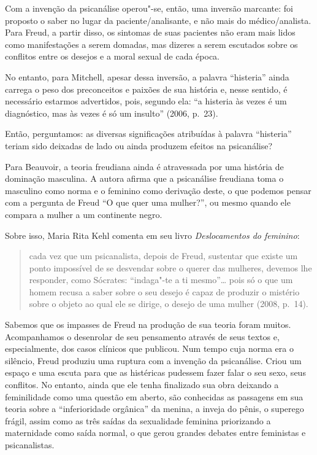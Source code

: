 Com a invenção da psicanálise operou"-se, então, uma inversão marcante:
foi proposto o saber no lugar da paciente/analisante, e não mais do
médico/analista. Para Freud, a partir disso, os sintomas de suas
pacientes não eram mais lidos como manifestações a serem domadas, mas
dizeres a serem escutados sobre os conflitos entre os desejos e a moral
sexual de cada época.

No entanto, para Mitchell, apesar dessa inversão, a palavra ``histeria''
ainda carrega o peso dos preconceitos e paixões de sua história e, nesse
sentido, é necessário estarmos advertidos, pois, segundo ela: ``a
histeria às vezes é um diagnóstico, mas às vezes é só um insulto''
(2006, p.~23).

Então, perguntamos: as diversas significações atribuídas à palavra
``histeria'' teriam sido deixadas de lado ou ainda produzem efeitos na
psicanálise?

\asterisc

Para Beauvoir, a teoria freudiana ainda é atravessada por uma história
de dominação masculina. A autora afirma que a psicanálise freudiana toma
o masculino como norma e o feminino como derivação deste, o que podemos
pensar com a pergunta de Freud ``O que quer uma mulher?'', ou mesmo
quando ele compara a mulher a um continente negro.

Sobre isso, Maria Rita Kehl comenta em seu livro \emph{Deslocamentos do
feminino}:

\begin{quote}
cada vez que um psicanalista, depois de Freud, sustentar que existe um
ponto impossível de se desvendar sobre o querer das mulheres, devemos
lhe responder, como Sócrates: ``indaga"-te a ti mesmo''\ldots{} pois só o que
um homem recusa a saber sobre o seu desejo é capaz de produzir o
mistério sobre o objeto ao qual ele se dirige, o desejo de uma mulher
(2008, p.~14).
\end{quote}

Sabemos que os impasses de Freud na produção de sua teoria foram muitos.
Acompanhamos o desenrolar de seu pensamento através de seus textos e,
especialmente, dos casos clínicos que publicou. Num tempo cuja norma era
o silêncio, Freud produziu uma ruptura com a invenção da psicanálise.
Criou um espaço e uma escuta para que as histéricas pudessem fazer falar
o seu sexo, seus conflitos. No entanto, ainda que ele tenha finalizado
sua obra deixando a feminilidade como uma questão em aberto, são
conhecidas as passagens em sua teoria sobre a ``inferioridade orgânica''
da menina, a inveja do pênis, o superego frágil, assim como as três
saídas da sexualidade feminina priorizando a maternidade como saída
normal, o que gerou grandes debates entre feministas e psicanalistas.

